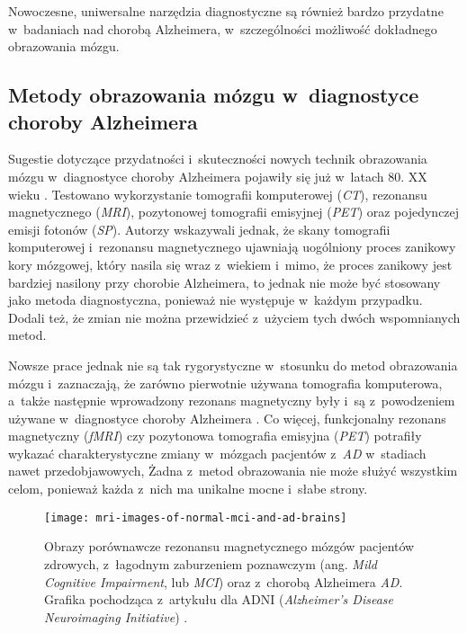 {Nowoczesne, uniwersalne narzędzia diagnostyczne są również bardzo przydatne w~badaniach nad chorobą Alzheimera, w~szczególności możliwość dokładnego obrazowania mózgu.

\subsection{Metody obrazowania mózgu w~diagnostyce choroby Alzheimera}

Sugestie dotyczące przydatności i~skuteczności nowych technik obrazowania mózgu w~diagnostyce choroby Alzheimera pojawiły się już w~latach 80. XX wieku \cite{mcgeer1986brain}.
Testowano wykorzystanie tomografii komputerowej (\emph{CT}), rezonansu magnetycznego (\emph{MRI}), pozytonowej tomografii emisyjnej (\emph{PET}) oraz pojedynczej emisji fotonów (\emph{SP}).
Autorzy wskazywali jednak, że skany tomografii komputerowej i~rezonansu magnetycznego ujawniają uogólniony proces zanikowy kory mózgowej, który nasila się wraz z~wiekiem i~mimo, że proces zanikowy jest bardziej nasilony przy chorobie Alzheimera, to jednak nie może być stosowany jako metoda diagnostyczna, ponieważ nie występuje w~każdym przypadku.
Dodali też, że zmian nie można przewidzieć z~użyciem tych dwóch wspomnianych metod.

Nowsze prace jednak nie są tak rygorystyczne w~stosunku do metod obrazowania mózgu i~zaznaczają, że zarówno pierwotnie używana tomografia komputerowa, a~także następnie wprowadzony rezonans magnetyczny były i~są z~powodzeniem używane w~diagnostyce choroby Alzheimera \cite{johnson2012brain}.
Co więcej, funkcjonalny rezonans magnetyczny (\emph{fMRI}) czy pozytonowa tomografia emisyjna (\emph{PET}) potrafiły wykazać charakterystyczne zmiany w~mózgach pacjentów z~\emph{AD} w~stadiach nawet przedobjawowych,
Żadna z~metod obrazowania nie może służyć wszystkim celom, ponieważ każda z~nich ma unikalne mocne i~słabe strony.

\begin{figure}[ht]
  \texttt{[image: mri-images-of-normal-mci-and-ad-brains]}
  \caption[Obrazy porównawcze rezonansu magnetycznego mózgów pacjentów z~chorobą Alzheimera oraz zdrowych]{Obrazy porównawcze rezonansu magnetycznego mózgów pacjentów zdrowych, z~łagodnym zaburzeniem poznawczym (ang. \emph{Mild Cognitive Impairment}, lub \emph{MCI}) oraz z~chorobą Alzheimera \emph{AD}. Grafika pochodząca z~artykułu dla ADNI (\emph{Alzheimer's Disease Neuroimaging Initiative}) \cite{chandra2019magnetic}.}
  \label{mri-images-of-normal-mci-and-ad-brains}
\end{figure}

}
